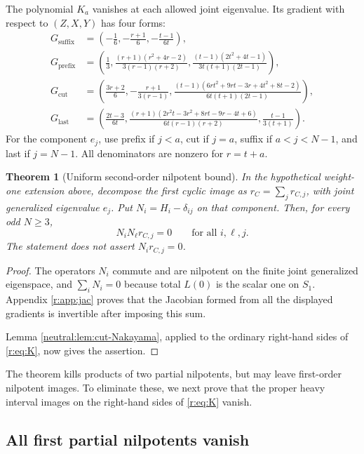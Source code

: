 \documentclass[11pt,a4paper]{article}
\numberwithin{equation}{section}
\newtheorem{theorem}{Theorem}[section]
\theoremstyle{definition}\newtheorem{definition}[theorem]{Definition}
\theoremstyle{remark}\newtheorem{remark}[theorem]{Remark}
\begin{document}
The polynomial \(K_a\) vanishes at each allowed joint eigenvalue.
Its gradient with respect to \((Z,X,Y)\) has four forms:
\begin{align*}
 G_{\mathrm{suffix}}&=
 \left(-\frac16,-\frac{r+1}6,-\frac{t-1}{6t}\right),\\
 G_{\mathrm{prefix}}&=
 \left(\frac13,
 \frac{(r+1)(r^2+4r-2)}{3(r-1)(r+2)},
 \frac{(t-1)(2t^2+4t-1)}{3t(t+1)(2t-1)}\right),\\
 G_{\mathrm{cut}}&=
 \left(\frac{3r+2}6,-\frac{r+1}{3(r-1)},
 \frac{(t-1)(6rt^2+9rt-3r+4t^2+8t-2)}
      {6t(t+1)(2t-1)}\right),\\
 G_{\mathrm{last}}&=
 \left(\frac{2t-3}{6t},
 \frac{(r+1)(2r^2t-3r^2+8rt-9r-4t+6)}
      {6t(r-1)(r+2)},
 \frac{t-1}{3(t+1)}\right).
\end{align*}
For the component \(e_j\), use prefix if \(j<a\), cut if \(j=a\),
suffix if \(a<j<N-1\), and last if \(j=N-1\).
All denominators are nonzero for \(r=t+a\).

\begin{theorem}[Uniform second-order nilpotent bound]\label{r:thm:nil}
In the hypothetical weight-one extension above, decompose the
first cyclic image as \(r_C=\sum_jr_{C,j}\), with joint generalized
eigenvalue \(e_j\). Put \(N_i=H_i-\delta_{ij}\) on that component.
Then, for every odd \(N\ge3\),
\[
                         N_iN_\ell r_{C,j}=0
                         \qquad\text{for all }i,\ell,j.
\]
The statement does not assert \(N_ir_{C,j}=0\).
\end{theorem}

\begin{proof}
The operators \(N_i\) commute and are nilpotent on the finite
joint generalized eigenspace, and \(\sum_iN_i=0\) because total
\(L(0)\) is the scalar one on \(S_1\).
Appendix \ref{r:app:jac} proves that the Jacobian formed from all
the displayed gradients is invertible after imposing this sum.

Lemma \ref{neutral:lem:cut-Nakayama}, applied to the ordinary
right-hand sides of \eqref{r:eq:K}, now gives the assertion.
\end{proof}

The theorem kills products of two partial nilpotents, but may leave
first-order nilpotent images.  To eliminate these, we next prove that
the proper heavy interval images on the right-hand sides of
\eqref{r:eq:K} vanish.

\subsection{All first partial nilpotents vanish}
\end{document}
